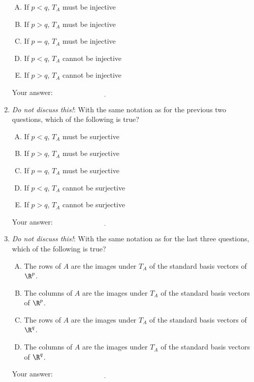 \documentclass[10pt]{amsart}
\begin{document}
\begin{enumerate}
  \begin{enumerate}[(A)]
  \item If $p < q$, $T_A$ must be injective
  \item If $p > q$, $T_A$ must be injective
  \item If $p = q$, $T_A$ must be injective
  \item If $p < q$, $T_A$ cannot be injective
  \item If $p > q$, $T_A$ cannot be injective
  \end{enumerate}

  \vspace{0.1in}
  Your answer: $\underline{\qquad\qquad\qquad\qquad\qquad\qquad\qquad}$
  \vspace{0.1in}

\item {\em Do not discuss this!}: With the same notation as for the
  previous two questions, which of the following is true?

  \begin{enumerate}[(A)]
  \item If $p < q$, $T_A$ must be surjective
  \item If $p > q$, $T_A$ must be surjective
  \item If $p = q$, $T_A$ must be surjective
  \item If $p < q$, $T_A$ cannot be surjective
  \item If $p > q$, $T_A$ cannot be surjective
  \end{enumerate}

  \vspace{0.1in}
  Your answer: $\underline{\qquad\qquad\qquad\qquad\qquad\qquad\qquad}$
  \vspace{0.1in}

\item {\em Do not discuss this!}: With the same notation as for the
  last three questions, which of the following is true?

  \begin{enumerate}[(A)]
  \item The rows of $A$ are the images under $T_A$ of the standard
    basis vectors of $\R^p$.
  \item The columns of $A$ are the images under $T_A$ of the standard
    basis vectors of $\R^p$.
  \item The rows of $A$ are the images under $T_A$ of the standard
    basis vectors of $\R^q$.
  \item The columns of $A$ are the images under $T_A$ of the standard
    basis vectors of $\R^q$.
  \end{enumerate}

  \vspace{0.1in}
  Your answer: $\underline{\qquad\qquad\qquad\qquad\qquad\qquad\qquad}$
  \vspace{0.1in}

\end{enumerate}
\end{document}

